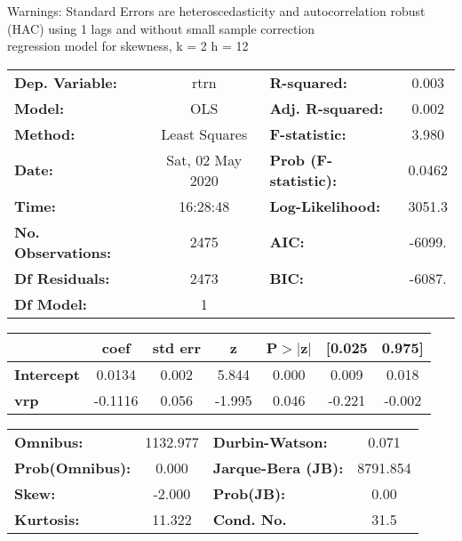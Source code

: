 Warnings: \newline
 [1] Standard Errors are heteroscedasticity and autocorrelation robust (HAC) using 1 lags and without small sample correction\\ 

regression model for skewness, k = 2 h = 12\begin{center}
\begin{tabular}{lclc}
\toprule
\textbf{Dep. Variable:}    &       rtrn       & \textbf{  R-squared:         } &     0.003   \\
\textbf{Model:}            &       OLS        & \textbf{  Adj. R-squared:    } &     0.002   \\
\textbf{Method:}           &  Least Squares   & \textbf{  F-statistic:       } &     3.980   \\
\textbf{Date:}             & Sat, 02 May 2020 & \textbf{  Prob (F-statistic):} &   0.0462    \\
\textbf{Time:}             &     16:28:48     & \textbf{  Log-Likelihood:    } &    3051.3   \\
\textbf{No. Observations:} &        2475      & \textbf{  AIC:               } &    -6099.   \\
\textbf{Df Residuals:}     &        2473      & \textbf{  BIC:               } &    -6087.   \\
\textbf{Df Model:}         &           1      & \textbf{                     } &             \\
\bottomrule
\end{tabular}
\begin{tabular}{lcccccc}
                   & \textbf{coef} & \textbf{std err} & \textbf{z} & \textbf{P$> |$z$|$} & \textbf{[0.025} & \textbf{0.975]}  \\
\midrule
\textbf{Intercept} &       0.0134  &        0.002     &     5.844  &         0.000        &        0.009    &        0.018     \\
\textbf{vrp}       &      -0.1116  &        0.056     &    -1.995  &         0.046        &       -0.221    &       -0.002     \\
\bottomrule
\end{tabular}
\begin{tabular}{lclc}
\textbf{Omnibus:}       & 1132.977 & \textbf{  Durbin-Watson:     } &    0.071  \\
\textbf{Prob(Omnibus):} &   0.000  & \textbf{  Jarque-Bera (JB):  } & 8791.854  \\
\textbf{Skew:}          &  -2.000  & \textbf{  Prob(JB):          } &     0.00  \\
\textbf{Kurtosis:}      &  11.322  & \textbf{  Cond. No.          } &     31.5  \\
\bottomrule
\end{tabular}
\end{center}

